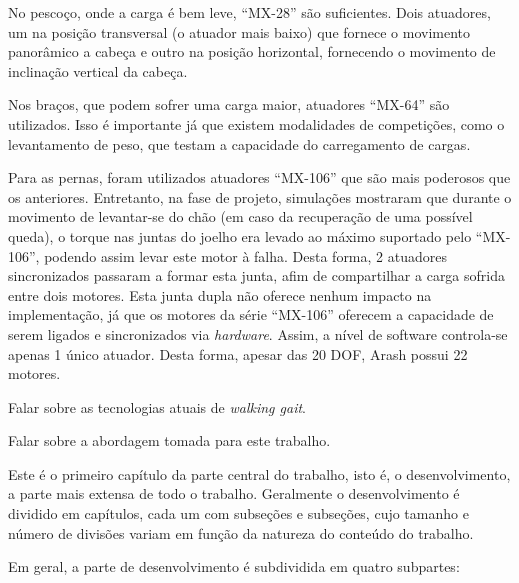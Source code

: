 No pescoço, onde a carga é bem leve, ``MX-28'' são suficientes. Dois atuadores, um na posição transversal (o atuador mais baixo) que fornece o movimento panorâmico a cabeça e outro na posição horizontal, fornecendo o movimento de inclinação vertical da cabeça.

Nos braços, que podem sofrer uma carga maior, atuadores ``MX-64'' são utilizados. Isso é importante já que existem modalidades de competições, como o levantamento de peso, que testam a capacidade do carregamento de cargas.

Para as pernas, foram utilizados atuadores ``MX-106'' que são mais poderosos que os anteriores. Entretanto, na fase de projeto, simulações mostraram que durante o movimento de levantar-se do chão (em caso da recuperação de uma possível queda), o torque nas juntas do joelho era levado ao máximo suportado pelo ``MX-106'', podendo assim levar este motor à falha. Desta forma, 2 atuadores sincronizados passaram a formar esta junta, afim de compartilhar a carga sofrida entre dois motores. Esta junta dupla não oferece nenhum impacto na implementação, já que os motores da série ``MX-106'' oferecem a capacidade de serem ligados e sincronizados via \textit{hardware}. Assim, a nível de software controla-se apenas 1 único atuador. Desta forma, apesar das 20 DOF, Arash possui 22 motores.

\begin{guide}
	Falar sobre as tecnologias atuais de \textit{walking gait}.
\end{guide}

\begin{guide}
	Falar sobre a abordagem tomada para este trabalho.
\end{guide}

Este é o primeiro capítulo da parte central do trabalho, isto é, o desenvolvimento, a parte mais extensa de todo o trabalho. Geralmente o desenvolvimento é dividido em capítulos, cada um com subseções e subseções, cujo tamanho e número de divisões variam em função da natureza do conteúdo do trabalho.

Em geral, a parte de desenvolvimento é subdividida em quatro subpartes:

